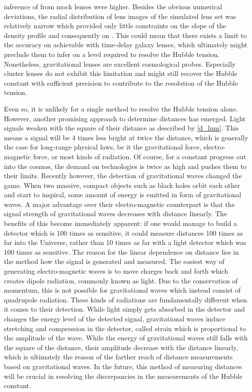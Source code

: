 inference of \Ho{} from mock lenses were higher.  Besides the obvious numerical
deviations, the radial distribution of lens images of the simulated lens set was
relatively narrow which provided only little constraints on the slope of the
density profile and consequently on \Ho.  This could mean that there exists a
limit to the accuracy on \Ho{} achievable with time-delay galaxy lenses, which
ultimately might preclude them to infer \Ho{} on a level required to resolve the
Hubble tension.  Nonetheless, gravitational lenses are excellent cosmological
probes. Especially cluster lenses do not exhibit this limitation and might still
recover the Hubble constant with sufficient precision to contribute to the
resolution of the Hubble tension.

Even so, it is unlikely for a single method to resolve the Hubble tension alone.
However, another promising approach to determine distances has emerged.  Light
signals weaken with the square of their distance as described by \eqref{d_lum}.
This means a signal will be 4 times less bright at twice the distance, which is
generally the case for long-range physical laws, be it the gravitational force,
electro-magnetic force, or most kinds of radiation.  Of course, for a constant
progress out into the cosmos, the demand on technologies is twice as high and
pushes them to their limits.  Recently however, the detection of gravitational
waves changed the game.  When two massive, compact objects such as black holes
orbit each other and start to inspiral, some amount of energy is emitted in form
of gravitational waves.  A major
advantage over their electro-magnetic counterpart is that the signal strength of
gravitational waves decreases with distance linearly.  The benefits of this
become immediately apparent: if one would manage to build a detector which is
100 times as sensitive, it could measure distances 100 times as far into the
Universe, rather than 10 times as far with a light detector which was 100 times
as sensitive.  The reason for the linear dependence on distance lies in the
method how the signal is generated and measured.  The easiest way of generating
electro-magnetic waves is to move charges back and forth which creates dipole
radiation, commonly known as light.  Due to the conservation of momentum, this
is not possible for gravitational waves which instead consist of quadrupole
radiation.  These kinds of radiations are fundamentally different when it comes
to their detection.  While light simply gets absorbed in the detector and
changes the energy level of the detected signal, gravitational waves induce
stretching and compression in the detector, called strain which is proportional
to the amplitude of the wave.  While the energy of gravitational waves still
falls with the square of the distance, their amplitude decrease with the
distance linearly, which is ultimately the reason of the farther reach of
distance measurements based on gravitational waves.  In the future, this method
of measuring distances will be crucial in resolving the discrepancies in the
measurements of the Hubble constant.
